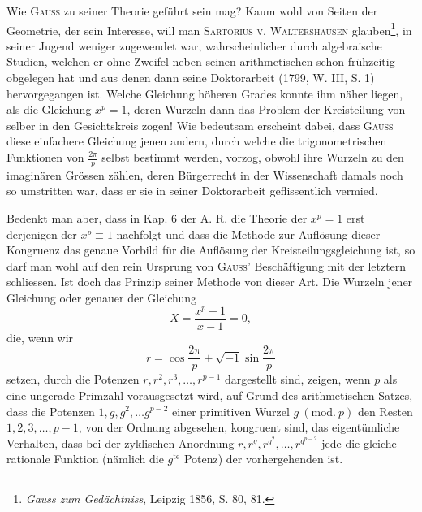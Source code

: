 Wie \textsc{Gauss} zu seiner Theorie geführt sein mag? Kaum wohl von Seiten der Geometrie, der sein Interesse, will man \textsc{Sartorius v. Waltershausen} glauben\footnote{\textit{Gauss zum Gedächtniss}, Leipzig 1856, S. 80, 81.}, in seiner Jugend weniger zugewendet war, wahrscheinlicher durch algebraische Studien, welchen er ohne Zweifel neben seinen arithmetischen schon frühzeitig obgelegen hat und aus denen dann seine Doktorarbeit (1799, W. III, S. 1) hervorgegangen ist. Welche Gleichung höheren Grades konnte ihm näher liegen, als die Gleichung \(x^p=1\), deren Wurzeln dann das Problem der Kreisteilung von selber in den Gesichtskreis zogen! Wie bedeutsam erscheint dabei, dass \textsc{Gauss} diese einfachere Gleichung jenen andern, durch welche die trigonometrischen Funktionen von \(\frac{2\pi}{p}\) selbst bestimmt werden, vorzog, obwohl ihre Wurzeln zu den imaginären Grössen zählen, deren Bürgerrecht in der Wissenschaft damals noch so umstritten war, dass er sie in seiner Doktorarbeit geflissentlich vermied.

Bedenkt man aber, dass in Kap. 6 der A. R. die Theorie der  \(x^p=1\) erst derjenigen der  \(x^p\equiv1\) nachfolgt und dass die Methode zur Auflösung dieser Kongruenz das genaue Vorbild für die Auflösung der Kreisteilungsgleichung ist, so darf man wohl auf den rein  Ursprung von \textsc{Gauss}’ Beschäftigung mit der letztern schliessen. Ist doch das Prinzip seiner Methode von dieser Art. Die Wurzeln jener Gleichung oder
\newpage{}
\noindent genauer der Gleichung
\[
X=\frac{x^p-1}{x-1}=0,
\]
die, wenn wir
\[
r=\cos\frac{2\pi}{p}+\sqrt{-1}\sin\frac{2\pi}{p}
\]
setzen, durch die Potenzen \(r,r^2,r^3,\ldots,r^{p-1}\) dargestellt sind, zeigen, wenn \(p\) als eine ungerade Primzahl vorausgesetzt wird, auf Grund des arithmetischen Satzes, dass die Potenzen \(1,g,g^2,\ldots g^{p-2}\) einer primitiven Wurzel \(g\ (\mathrm{mod.}\ p)\) den Resten \(1,2,3,\ldots,p-1\), von der Ordnung abgesehen, kongruent sind, das eigentümliche Verhalten, dass bei der zyklischen Anordnung \(r,r^g,r^{g^2},\ldots,r^{g^{p-2}}\) jede die gleiche rationale Funktion (nämlich die \(g^{\mathrm{te}}\) Potenz) der vorhergehenden ist. 

